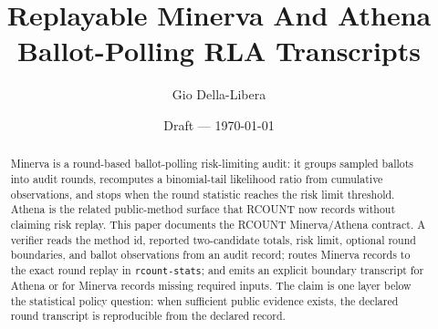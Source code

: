 \documentclass[12pt]{article}
\title{Replayable Minerva And Athena Ballot-Polling RLA Transcripts}
\author{Gio Della-Libera}
\date{Draft --- \today}
\begin{document}
\maketitle

\begin{abstract}
Minerva is a round-based ballot-polling risk-limiting audit: it groups sampled
ballots into audit rounds, recomputes a binomial-tail likelihood ratio from
cumulative observations, and stops when the round statistic reaches the risk
limit threshold. Athena is the related public-method surface that RCOUNT now
records without claiming risk replay. This paper documents the RCOUNT
Minerva/Athena contract. A verifier reads the method id, reported two-candidate
totals, risk limit, optional round boundaries, and ballot observations from an
audit record; routes Minerva records to the exact round replay in
\texttt{rcount-stats}; and emits an explicit boundary transcript for Athena or
for Minerva records missing required inputs. The claim is one layer below the
statistical policy question: when sufficient public evidence exists, the
declared round transcript is reproducible from the declared record.
\end{abstract}








\nocite{rcount-overview-2026,rcount-v12-2026}


\end{document}
